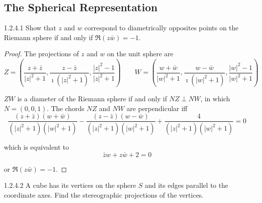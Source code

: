 \subsection{The Spherical Representation}

\begin{problem}{1.2.4.1}
Show that \( z \) and \( w \) correspond to diametrically opposites points on the Riemann sphere if and only if \( \Re{(z\bar{w})} = -1 \).
\end{problem}

\begin{proof}
	The projections of \( z \) and \( w \) on the unit sphere are
	\[
		Z = \left( \dfrac{z + \bar{z}}{{\left\vert z \right\vert}^{2} + 1}, \dfrac{z - \bar{z}}{\imath ({\left\vert z \right\vert}^{2} + 1)}, \dfrac{{\left\vert z \right\vert}^{2} - 1}{{\left\vert z \right\vert}^{2} + 1} \right) \qquad
		W = \left( \dfrac{w + \bar{w}}{{\left\vert w \right\vert}^{2} + 1}, \dfrac{w - \bar{w}}{\imath ({\left\vert w \right\vert}^{2} + 1)}, \dfrac{{\left\vert w \right\vert}^{2} - 1}{{\left\vert w \right\vert}^{2} + 1} \right)
	\]

	\( ZW \) is a diameter of the Riemann sphere if and only if \( NZ \perp NW \), in which \( N = (0,0,1) \). The chords \( NZ \) and \( NW \) are perpendicular iff
	\[
		\dfrac{(z + \bar{z})(w + \bar{w})}{({\left\vert z \right\vert}^{2} + 1)({\left\vert w \right\vert}^{2} + 1)} - \dfrac{(z - \bar{z})(w - \bar{w})}{({\left\vert z \right\vert}^{2} + 1)({\left\vert w \right\vert}^{2} + 1)} + \dfrac{4}{({\left\vert z \right\vert}^{2} + 1)({\left\vert w \right\vert}^{2} + 1)} = 0
	\]

	which is equivalent to
	\[
		\bar{z}w + z\bar{w} + 2 = 0
	\]

	or \( \Re{(z\bar{w})} = -1 \).
\end{proof}

\begin{problem}{1.2.4.2}
A cube has its vertices on the sphere \( S \) and its edges parallel to the coordinate axes. Find the stereographic projections of the vertices.
\end{problem}

